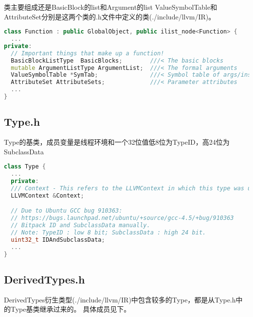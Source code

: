 \documentclass{ctexart}
\begin{document}
类主要组成还是BasicBlock的list和Argument的list
ValueSymbolTable和AttributeSet分别是这两个类的.h文件中定义的类(./include/llvm/IR)。
\begin{lstlisting}[language=C++]
class Function : public GlobalObject, public ilist_node<Function> {
  ...
private:
  // Important things that make up a function!
  BasicBlockListType  BasicBlocks;        ///< The basic blocks
  mutable ArgumentListType ArgumentList;  ///< The formal arguments
  ValueSymbolTable *SymTab;               ///< Symbol table of args/instructions
  AttributeSet AttributeSets;             ///< Parameter attributes
  ...
}
\end{lstlisting}
  
\subsection{Type.h}
Type的基类，成员变量是线程环境和一个32位值低8位为TypeID，高24位为SubclassData
\begin{lstlisting}[language=C++]
class Type {
  ...
  private:
  /// Context - This refers to the LLVMContext in which this type was uniqued.
  LLVMContext &Context;

  // Due to Ubuntu GCC bug 910363:
  // https://bugs.launchpad.net/ubuntu/+source/gcc-4.5/+bug/910363
  // Bitpack ID and SubclassData manually.
  // Note: TypeID : low 8 bit; SubclassData : high 24 bit.
  uint32_t IDAndSubclassData;
  ...
}
\end{lstlisting}	
  

\subsection{DerivedTypes.h}
DerivedTypes衍生类型(./include/llvm/IR)中包含较多的Type，都是从Type.h中的Type基类继承过来的。
具体成员见下。
\par
{}
\end{document}
